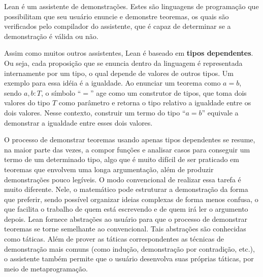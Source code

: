 \documentclass[12pt, oneside, a4paper,english,brazil]{abntex2}
\begin{document}
\qquad Lean\cite{2} \'e um assistente de demonstra\c{c}\~oes. Estes s\~ao linguagens de programa\c{c}\~ao que
possibilitam que seu usu\'ario enuncie e demonstre teoremas, os quais s\~ao verificados pelo compilador do
assistente, que \'e capaz de determinar se a demonstra\c{c}\~ao \'e v\'alida ou n\~ao.

\qquad Assim como muitos outros assistentes, Lean \'e baseado em \textbf{tipos
  dependentes}\cite{typesAtWork}. Ou seja, cada proposi\c{c}\~ao que se enuncia dentro da linguagem \'e
representada internamente por um tipo, o qual depende de valores de outros tipos. Um exemplo para essa
id\'eia \'e a igualdade. Ao enunciar um teorema como $a = b$, sendo $a, b : T$, o s\'imbolo ``$=$'' age como
um construtor de tipos, que toma dois valores do tipo $T$ como par\^ametro e retorna o tipo relativo a
igualdade entre os dois valores. Nesse contexto, construir um termo do tipo ``$a = b$'' equivale a demonstrar
a igualdade entre esses dois valores.

\qquad O processo de demonstrar teoremas usando apenas tipos dependentes se resume, na maior parte das vezes, a compor fun\c{c}\~oes e analisar casos para conseguir um termo de um determinado tipo, algo que \'e muito dif\'icil de ser praticado em teoremas que envolvem uma longa argumenta\c{c}\~ao, al\'em de produzir demonstra\c{c}\~oes pouco leg\'iveis. O modo convencional de realizar essa tarefa \'e muito diferente. Nele,
o matem\'atico pode estruturar a demonstra\c{c}\~ao da forma que preferir, sendo poss\'ivel organizar
ideias complexas de forma menos confusa, o que facilita o trabalho de quem est\'a escrevendo e de quem ir\'a
ler o argumento depois.
Lean fornece abstra\c{c}\~oes ao usu\'ario para que o processo de demonstrar teoremas se torne semelhante ao
convencional. Tais abstra\c{c}\~oes s\~ao conhecidas como t\'aticas. Al\'em de prover as t\'aticas
correspondentes as t\'ecnicas de demonstra\c{c}\~ao mais comuns (como indu\c{c}\~ao, demonstra\c{c}\~ao por contradi\c{c}\~ao, etc.), o assistente tamb\'em permite que o usu\'ario desenvolva suas pr\'oprias t\'aticas, por meio de metaprograma\c{c}\~ao\cite{metaprog}.
\end{document}
